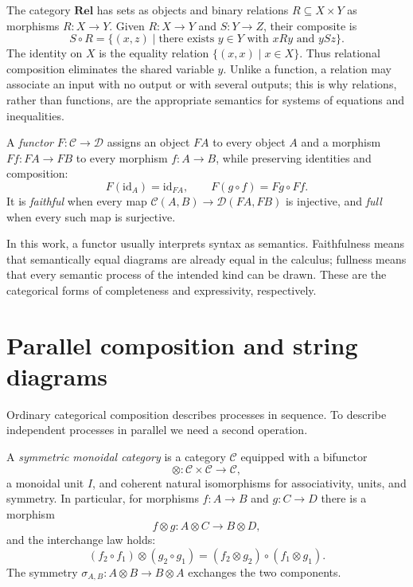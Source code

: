 \begin{example}[Relations]\label{ex:appendix-rel}
The category $\mathbf{Rel}$ has sets as objects and binary relations
$R\subseteq X\times Y$ as morphisms $R:X\to Y$.  Given $R:X\to Y$ and
$S:Y\to Z$, their composite is
\[
 S\circ R
 =\{(x,z)\mid \text{there exists }y\in Y
              \text{ with }xRy\text{ and }ySz\}.
\]
The identity on $X$ is the equality relation
$\{(x,x)\mid x\in X\}$.  Thus relational composition eliminates the shared
variable $y$.  Unlike a function, a relation may associate an input with no
output or with several outputs; this is why relations, rather than functions,
are the appropriate semantics for systems of equations and inequalities.
\end{example}

\begin{definition}[Functor]
A \emph{functor} $F:\mathcal C\to\mathcal D$ assigns an object $FA$ to every
object $A$ and a morphism $Ff:FA\to FB$ to every morphism $f:A\to B$, while
preserving identities and composition:
\[
 F(\mathrm{id}_A)=\mathrm{id}_{FA},
 \qquad
 F(g\circ f)=Fg\circ Ff.
\]
It is \emph{faithful} when every map
$\mathcal C(A,B)\to\mathcal D(FA,FB)$ is injective, and \emph{full} when every
such map is surjective.
\end{definition}

In this work, a functor usually interprets syntax as semantics.  Faithfulness
means that semantically equal diagrams are already equal in the calculus;
fullness means that every semantic process of the intended kind can be drawn.
These are the categorical forms of completeness and expressivity,
respectively.

\section{Parallel composition and string diagrams}

Ordinary categorical composition describes processes in sequence.  To describe
independent processes in parallel we need a second operation.

\begin{definition}\label{appendix:smc}
A \emph{symmetric monoidal category} is a category $\mathcal C$ equipped with a
bifunctor
\[
 \otimes:\mathcal C\times\mathcal C\longrightarrow\mathcal C,
\]
a monoidal unit $I$, and coherent natural isomorphisms for associativity,
units, and symmetry.  In particular, for morphisms $f:A\to B$ and $g:C\to D$
there is a morphism
\[
 f\otimes g:A\otimes C\longrightarrow B\otimes D,
\]
and the interchange law holds:
\[
 (f_2\circ f_1)\otimes(g_2\circ g_1)
 = (f_2\otimes g_2)\circ(f_1\otimes g_1).
\]
The symmetry $\sigma_{A,B}:A\otimes B\to B\otimes A$ exchanges the two
components.
\end{definition}

